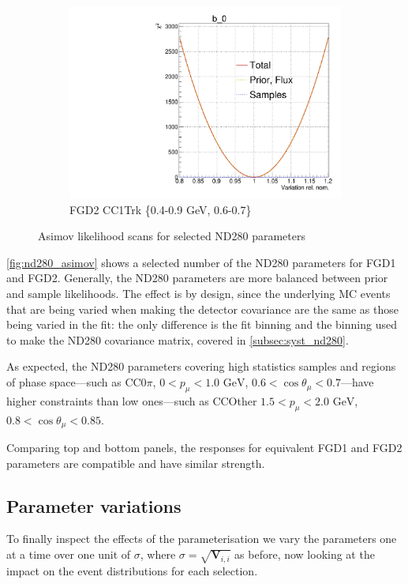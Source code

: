 \begin{figure}[!h]
\begin{subfigure}[t]{0.32\textwidth}
	\includegraphics[width=\textwidth, trim={0mm 0mm 0mm 11mm}, clip,page=542]{figures/mach3/Asimov/Full_LLHscan_18July_BeRPA_U_ND280logL_scan}
	\caption{FGD2 \numubar CC1Trk \{0.4-0.9 GeV, 0.6-0.7\}}
\end{subfigure}
\caption{Asimov likelihood scans for selected ND280 parameters}
\label{fig:nd280_asimov}
\end{figure}

\autoref{fig:nd280_asimov} shows a selected number of the ND280 parameters for FGD1 and FGD2. Generally, the ND280 parameters are more balanced between prior and sample likelihoods. The effect is by design, since the underlying MC events that are being varied when making the detector covariance are the same as those being varied in the fit: the only difference is the fit binning and the binning used to make the ND280 covariance matrix, covered in \autoref{subsec:syst_nd280}.

As expected, the ND280 parameters covering high statistics samples and regions of phase space---such as CC0$\pi$, $0<p_\mu<1.0\text{ GeV}$, $0.6 < \cos\theta_\mu < 0.7$---have higher constraints than low ones---such as CCOther $1.5 < p_\mu < 2.0\text{ GeV}$, $0.8 < \cos\theta_\mu < 0.85$.

Comparing top and bottom panels, the responses for equivalent FGD1 and FGD2 parameters are compatible and have similar strength.

\subsection{Parameter variations}
\label{sec:sigmavar}
To finally inspect the effects of the parameterisation we vary the parameters one at a time over one unit of $\sigma$, where $\sigma = \sqrt{\mathbf{V}_{i,i}}$ as before, now looking at the impact on the event distributions for each selection.

